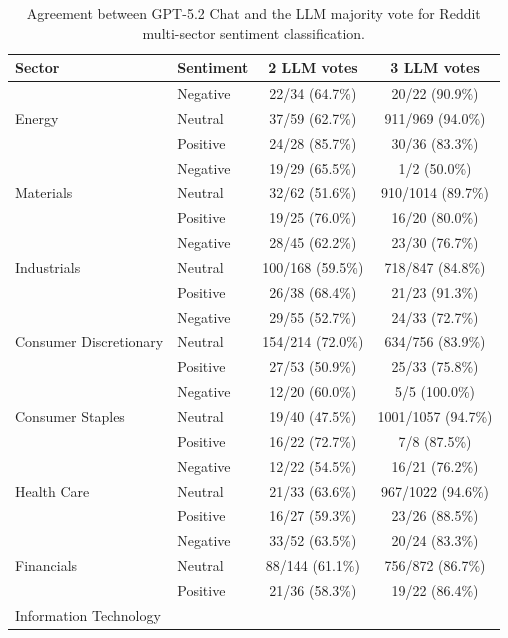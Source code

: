 \begin{table}[ht]
\centering
\caption{Agreement between GPT-5.2 Chat and the LLM majority vote for Reddit multi-sector sentiment classification.}
\label{tab:redditllm_agreement_sector_full}
\renewcommand{\arraystretch}{1.2}
\begin{tabular}{|l|l|c|c|}
\hline
\textbf{Sector} & \textbf{Sentiment} & \textbf{2 LLM votes} & \textbf{3 LLM votes} \\
\hline
\multirow{3}{*}{Energy}
& Negative & 22/34 (64.7\%) & 20/22 (90.9\%) \\
& Neutral  & 37/59 (62.7\%) & 911/969 (94.0\%) \\
& Positive & 24/28 (85.7\%) & 30/36 (83.3\%) \\
\hline
\multirow{3}{*}{Materials}
& Negative & 19/29 (65.5\%) & 1/2 (50.0\%) \\
& Neutral  & 32/62 (51.6\%) & 910/1014 (89.7\%) \\
& Positive & 19/25 (76.0\%) & 16/20 (80.0\%) \\
\hline
\multirow{3}{*}{Industrials}
& Negative & 28/45 (62.2\%) & 23/30 (76.7\%) \\
& Neutral  & 100/168 (59.5\%) & 718/847 (84.8\%) \\
& Positive & 26/38 (68.4\%) & 21/23 (91.3\%) \\
\hline
\multirow{3}{*}{Consumer Discretionary}
& Negative & 29/55 (52.7\%) & 24/33 (72.7\%) \\
& Neutral  & 154/214 (72.0\%) & 634/756 (83.9\%) \\
& Positive & 27/53 (50.9\%) & 25/33 (75.8\%) \\
\hline
\multirow{3}{*}{Consumer Staples}
& Negative & 12/20 (60.0\%) & 5/5 (100.0\%) \\
& Neutral  & 19/40 (47.5\%) & 1001/1057 (94.7\%) \\
& Positive & 16/22 (72.7\%) & 7/8 (87.5\%) \\
\hline
\multirow{3}{*}{Health Care}
& Negative & 12/22 (54.5\%) & 16/21 (76.2\%) \\
& Neutral  & 21/33 (63.6\%) & 967/1022 (94.6\%) \\
& Positive & 16/27 (59.3\%) & 23/26 (88.5\%) \\
\hline
\multirow{3}{*}{Financials}
& Negative & 33/52 (63.5\%) & 20/24 (83.3\%) \\
& Neutral  & 88/144 (61.1\%) & 756/872 (86.7\%) \\
& Positive & 21/36 (58.3\%) & 19/22 (86.4\%) \\
\hline
\multirow{3}{*}{Information Technology}

\end{tabular}
\end{table}

